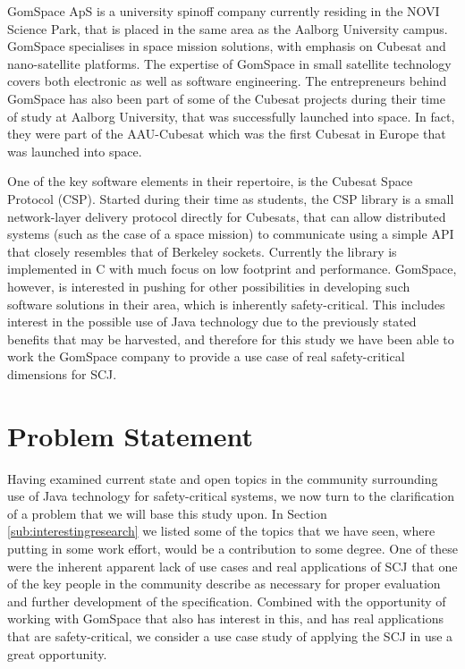GomSpace ApS is a university spinoff company currently residing in the NOVI Science Park, that is placed in the same area as the Aalborg University campus. GomSpace specialises in space mission solutions, with emphasis on Cubesat and nano-satellite platforms\cite{GomSpace}. The expertise of GomSpace in small satellite technology covers both electronic as well as software engineering. The entrepreneurs behind GomSpace has also been part of some of the Cubesat projects during their time of study at Aalborg University, that was successfully launched into space. In fact, they were part of the AAU-Cubesat which was the first Cubesat in Europe that was launched into space.

One of the key software elements in their repertoire, is the Cubesat Space Protocol (CSP). Started during their time as students, the CSP library is a small network-layer delivery protocol directly for Cubesats, that can allow distributed systems (such as the case of a space mission) to communicate using a simple API that closely resembles that of Berkeley sockets. Currently the library is implemented in C with much focus on low footprint and performance. GomSpace, however, is interested in pushing for other possibilities in developing such software solutions in their area, which is inherently safety-critical. This includes interest in the possible use of Java technology due to the previously stated benefits that may be harvested, and therefore for this study we have been able to work the GomSpace company to provide a use case of real safety-critical dimensions for SCJ.


\section{Problem Statement} %
\label{sec:problem_statement}
Having examined current state and open topics in the community surrounding use of Java technology for safety-critical systems, we now turn to the clarification of a problem that we will base this study upon. In Section \ref{sub:interestingresearch} we listed some of the topics that we have seen, where putting in some work effort, would be a contribution to some degree. One of these were the inherent apparent lack of use cases and real applications of SCJ that one of the key people in the community describe as necessary for proper evaluation and further development of the specification. Combined with the opportunity of working with GomSpace that also has interest in this, and has real applications that are safety-critical, we consider a use case study of applying the SCJ in use a great opportunity.

